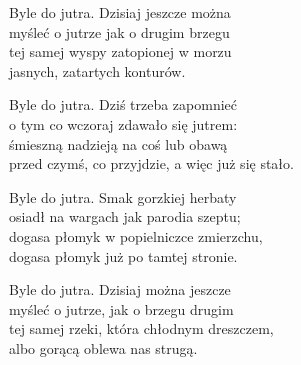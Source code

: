 \begin{text}
    Byle do jutra. Dzisiaj jeszcze można\\
    myśleć o jutrze jak o drugim brzegu\\
    tej samej wyspy zatopionej w morzu\\
    jasnych, zatartych konturów.

    Byle do jutra. Dziś trzeba zapomnieć\\
    o tym co wczoraj zdawało się jutrem:\\
    śmieszną nadzieją na coś lub obawą\\
    przed czymś, co przyjdzie, a więc już się stało.

    Byle do jutra. Smak gorzkiej herbaty\\
    osiadł na wargach jak parodia szeptu;\\
    dogasa płomyk w popielniczce zmierzchu,\\
    dogasa płomyk już po tamtej stronie.

    Byle do jutra. Dzisiaj można jeszcze\\
    myśleć o jutrze, jak o brzegu drugim\\
    tej samej rzeki, która chłodnym dreszczem,\\
    albo gorącą oblewa nas strugą.
\end{text}
\begin{chord}

\end{chord}